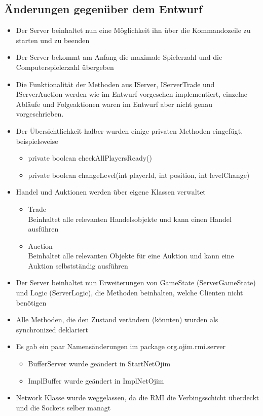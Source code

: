 \documentclass[a4paper,10pt]{article}
\begin{document}
\subsection {Änderungen gegenüber dem Entwurf}
\begin{itemize}
\item Der Server beinhaltet nun eine Möglichkeit ihn über die Kommandozeile zu starten und zu beenden
\item Der Server bekommt am Anfang die maximale Spielerzahl und die Computerspielerzahl übergeben
\item Die Funktionalität der Methoden aus IServer, IServerTrade und IServerAuction werden wie im Entwurf vorgesehen implementiert, einzelne Abläufe und Folgeaktionen waren im Entwurf aber nicht genau vorgeschrieben.
\item Der Übersichtlichkeit halber wurden einige privaten Methoden eingefügt, beispielsweise
\begin{itemize}
\item private boolean checkAllPlayersReady()
\item private boolean changeLevel(int playerId, int position, int levelChange)
\end{itemize}
\item Handel und Auktionen werden über eigene Klassen verwaltet
\begin{itemize}
\item Trade \\ Beinhaltet alle relevanten Handelsobjekte und kann einen Handel ausführen
\item Auction \\ Beinhaltet alle relevanten Objekte für eine Auktion und kann eine Auktion selbstständig ausführen
\end{itemize}
\item Der Server beinhaltet nun Erweiterungen von GameState (ServerGameState) und Logic (ServerLogic), die Methoden beinhalten, welche Clienten nicht benötigen
\item Alle Methoden, die den Zustand verändern (könnten) wurden als synchronized deklariert
\item Es gab ein paar Namensänderungen im package org.ojim.rmi.server 
\begin{itemize}
\item BufferServer wurde geändert in StartNetOjim
\item ImplBuffer wurde geändert in ImplNetOjim
\end{itemize}
\item Network Klasse wurde weggelassen, da die RMI die Verbingsschicht überdeckt und die Sockets selber managt

\end{itemize}
\end{document}
